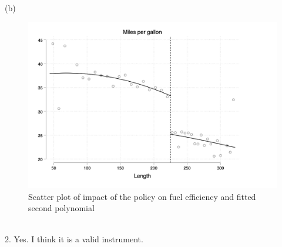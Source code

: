 \documentclass{article}
\begin{document}
(b) 
\begin{figure}[H]
\centering
 \includegraphics[scale = 0.9]{stata1b.png}
 \caption{Scatter plot of impact of the policy on fuel efficiency and fitted second polynomial}
 
 \end{figure}
 
 ~\\
 2. Yes. I think it is a valid instrument. 
\end{document}
